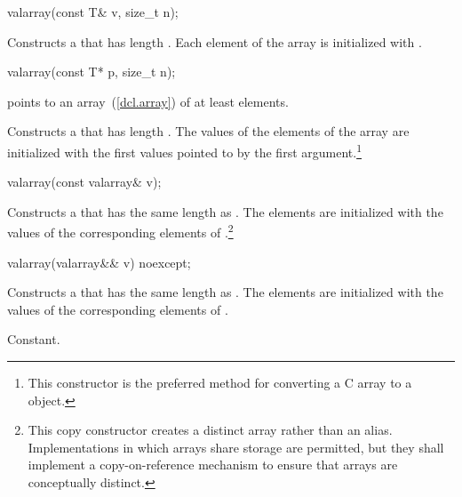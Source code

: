 %
\begin{itemdecl}
valarray(const T& v, size_t n);
\end{itemdecl}

\begin{itemdescr}
\pnum
\effects
Constructs a  that has length .
Each element of the array is initialized with .
\end{itemdescr}

%
\begin{itemdecl}
valarray(const T* p, size_t n);
\end{itemdecl}

\begin{itemdescr}
\pnum
\requires
{} points to an array~(\ref{dcl.array}) of at least
 elements.

\effects
Constructs a  that has length .
The values of the elements of the array are initialized with the
first
values pointed to by the first argument.\footnote{This constructor is the
preferred method for converting a C array to a
object.}
\end{itemdescr}

%
\begin{itemdecl}
valarray(const valarray& v);
\end{itemdecl}

\begin{itemdescr}
\pnum
\effects
Constructs a  that has the same length as .
The elements are initialized with the values of the corresponding
elements of .\footnote{This copy constructor creates
a distinct array rather than an alias.
Implementations in which arrays share storage are permitted, but they
shall implement a copy-on-reference mechanism to ensure that arrays are
conceptually distinct.}
\end{itemdescr}

%
\begin{itemdecl}
valarray(valarray&& v) noexcept;
\end{itemdecl}

\begin{itemdescr}
\pnum
\effects
Constructs a  that has the same length as .
The elements are initialized with the values of the corresponding
elements of .

\pnum
\complexity Constant.
\end{itemdescr}

